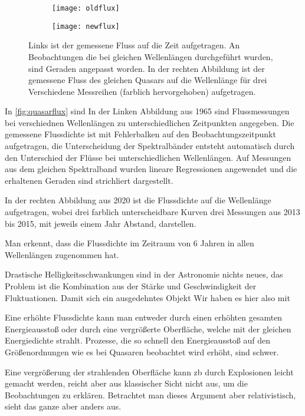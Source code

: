 \begin{figure}[H]
	\centering
	\begin{subfigure}{.45\textwidth}
		\centering
		\texttt{[image: oldflux]}
	\end{subfigure}%
	\begin{subfigure}{.55\textwidth}
		\centering
		\texttt{[image: newflux]}
	\end{subfigure}
	\caption{Links ist der gemessene Fluss auf die Zeit aufgetragen. An Beobachtungen die bei gleichen Wellenlängen durchgeführt wurden, sind Geraden angepasst worden. In der rechten Abbildung ist der gemessene Fluss des gleichen Quasars auf die Wellenlänge für drei Verschiedene Messreihen (farblich hervorgehoben) aufgetragen.}
	\label{fig:quasarflux}
\end{figure}

In \autoref{fig:quasarflux} sind 
In der Linken Abbildung aus 1965 \autocite{oldflux} sind Flussmessungen bei verschiednen Wellenlängen zu unterschiedlichen Zeitpunkten angegeben. Die gemessene Flussdichte ist mit Fehlerbalken auf den Beobachtungszeitpunkt aufgetragen, die Unterscheidung der Spektralbänder entsteht automatisch durch den Unterschied der Flüsse bei unterschiedlichen Wellenlängen. Auf Messungen aus dem gleichen Spektralband wurden lineare Regressionen angewendet und die erhaltenen Geraden sind strichliert dargestellt. 

In der rechten Abbildung aus 2020 \autocite{newflux} ist die Flussdichte auf die Wellenlänge aufgetragen, wobei drei farblich unterscheidbare Kurven drei Messungen aus 2013 bis 2015, mit jeweils einem Jahr Abstand, darstellen. 

Man erkennt, dass die Flussdichte im Zeitraum von 6 Jahren in allen Wellenlängen zugenommen hat. 

Drastische Helligkeitsschwankungen sind in der Astronomie nichts neues, das Problem ist die Kombination aus der Stärke und Geschwindigkeit der Fluktuationen. Damit sich ein ausgedehntes Objekt 
Wir haben es hier also mit 


Eine erhöhte Flussdichte kann man entweder durch einen erhöhten gesamten Energieausstoß oder durch eine vergrößerte Oberfläche, welche mit der gleichen Energiedichte strahlt. Prozesse, die so schnell den Energieausstoß auf den Größenordnungen wie es bei Quasaren beobachtet wird erhöht, sind schwer.

Eine vergrößerung der strahlenden Oberfläche kann zb durch Explosionen leicht gemacht werden, reicht aber aus klassischer Sicht nicht aus, um die Beobachtungen zu erklären. Betrachtet man dieses Argument aber relativistisch, sieht das ganze aber anders aus.

